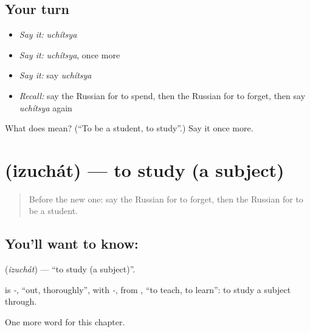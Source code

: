 \subsection*{Your turn}
\begin{itemize}
\raggedright
  \item \emph{Say it:} \emph{uchítsya}
  \item \emph{Say it:} \emph{uchítsya}, once more
  \item \emph{Say it:} say \emph{uchítsya}
  \item \emph{Recall:} say the Russian for to spend, then the Russian for to forget, then say \emph{uchítsya} again
\end{itemize}

\begin{tcolorbox}[breakable,colback=teal!4,colframe=teal!35!black,title={Before you move on}]
What does  mean? (\textquotedblleft{}To be a student, to study\textquotedblright{}.) Say it once more.
\end{tcolorbox}
\section[\texorpdfstring{\ru{изучать} (izuchát)}{изучать (izuchát)}]{ (izuchát) — to study (a subject)}

\label{lesson:RU-C205-izuchat}



\begin{quote}
Before the new one: say the Russian for to forget, then the Russian for to be a student.
\end{quote}

\subsection*{You'll want to know: }
\textbf{} (\emph{izuchát}) — \textquotedblleft{}to study (a subject)\textquotedblright{}.

\begin{cousinweb}
\textbf{} is \emph{-}, \textquotedblleft{}out, thoroughly\textquotedblright{}, with \emph{-}, from \emph{}, \textquotedblleft{}to teach, to learn\textquotedblright{}: to study a subject through.
\end{cousinweb}

\begin{grammarlens}[title={What you've built}]
One more word for this chapter.
\end{grammarlens}

